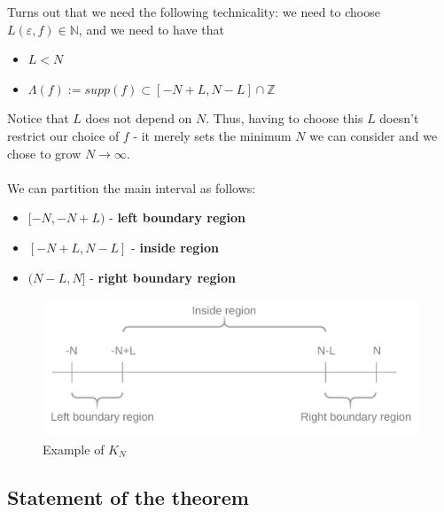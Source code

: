 \documentclass{beamer}
\begin{document}
\begin{frame}
    Turns out that we need the following technicality: we need to choose $L(\varepsilon, f) \in \mathbb{N}$, and we need to have that
    \begin{itemize}
        \item $L < N$
        \item $\Lambda(f) := supp(f) \subset [-N + L, N - L] \cap \mathbb{Z}$
    \end{itemize}
     Notice that $L$ does not depend on $N$. Thus, having to choose this $L$ doesn't restrict our choice of $f$ - it merely sets the minimum
     $N$ we can consider and we chose to grow $N \rightarrow \infty$.
    \\~\\
    We can partition the main interval as follows:
    \begin{itemize}
        \item $[-N, -N+L)$ - \textbf{left boundary region}
        \item $[-N+L, N-L]$ - \textbf{inside region}
        \item $(N-L, N]$ - \textbf{right boundary region}
    \end{itemize}

    \begin{figure}[H]
        \centering
        \includegraphics[scale=0.15]{./img/regions_df.png}
        \caption{Example of $K_N$}
        \label{fig:regions}
    \end{figure}
\end{frame}

\subsection{Statement of the theorem} %
\end{document}
